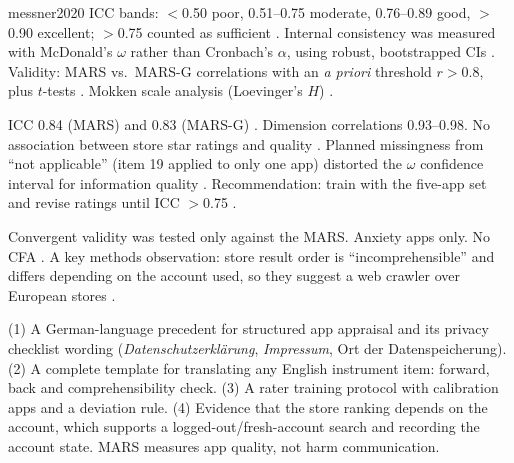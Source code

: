 \begin{papercard}{messner2020}
 ICC bands: $<$0.50 poor, 0.51--0.75 moderate, 0.76--0.89 good, $>$0.90 excellent; $>$0.75 counted as sufficient . Internal consistency was measured with McDonald's $\omega$ rather than Cronbach's $\alpha$, using robust, bootstrapped CIs . Validity: MARS vs.\ MARS-G correlations with an \emph{a priori} threshold $r>0.8$, plus $t$-tests . Mokken scale analysis (Loevinger's $H$) .

 ICC 0.84 (MARS) and 0.83 (MARS-G) . Dimension correlations 0.93--0.98. No association between store star ratings and quality . Planned missingness from ``not applicable'' (item 19 applied to only one app) distorted the $\omega$ confidence interval for information quality . Recommendation: train with the five-app set and revise ratings until ICC $>$0.75 .

 Convergent validity was tested only against the MARS. Anxiety apps only. No CFA . A key methods observation: store result order is ``incomprehensible'' and differs depending on the account used, so they suggest a web crawler over European stores .

 (1) A German-language precedent for structured app appraisal and its privacy checklist wording (\emph{Datenschutzerklärung}, \emph{Impressum}, Ort der Datenspeicherung). (2) A complete template for translating any English instrument item: forward, back and comprehensibility check. (3) A rater training protocol with calibration apps and a deviation rule. (4) Evidence that the store ranking depends on the account, which supports a logged-out/fresh-account search and recording the account state. MARS measures app quality, not harm communication.
\end{papercard}


